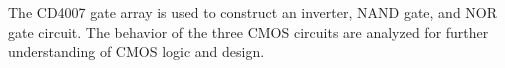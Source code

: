The CD4007 gate array is used to construct an inverter, NAND gate, and NOR gate circuit.
The behavior of the three CMOS circuits are analyzed for further understanding of CMOS logic and design.
